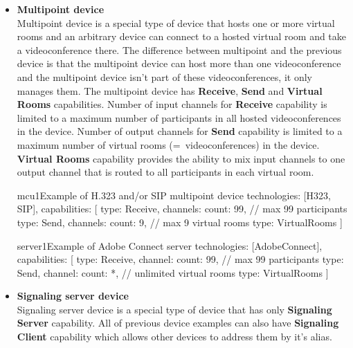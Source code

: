 \begin{itemize}
\begin{ResourceExample}{}{terminal4}%
      {Example of terminal with one virtual room for H.323 and/or SIP}
technologies: [H323, SIP],
capabilities: [
  {type: Receive, channels: {count: 9}}, // max 9 other participants
  {type: Send, channels: {count: 1}},
  {type: Mix}
]
\end{ResourceExample}

\item \textbf{Multipoint device} \\
  Multipoint device is a special type of device that hosts one or more virtual 
  rooms and an arbitrary device can connect to a hosted virtual room and take 
  a videoconference there. The difference between multipoint and the previous 
  device is that the multipoint device can host more than one videoconference 
  and the multipoint device isn't part of these videoconferences, it only 
  manages them. The multipoint device has \textbf{Receive}, \textbf{Send}
  and \textbf{Virtual Rooms} capabilities. Number of input 
  channels for \textbf{Receive} capability is limited to a maximum number of 
  participants in all hosted videoconferences in the device. Number of output 
  channels for \textbf{Send} capability is limited to a maximum number of 
  virtual rooms (=~videoconferences) in the device. \textbf{Virtual Rooms} 
  capability provides the ability to mix input channels to one output channel 
  that is routed to all participants in each virtual room.

\begin{ResourceExample}{}{mcu1}{Example of H.323 and/or SIP multipoint device}
technologies: [H323, SIP],
capabilities: [
  {type: Receive, channels: {count: 99}}, // max 99 participants
  {type: Send, channels: {count: 9}},     // max 9 virtual rooms
  {type: VirtualRooms}
]
\end{ResourceExample}

\begin{ResourceExample}{}{server1}{Example of Adobe Connect server}
technologies: [AdobeConnect],
capabilities: [
  {type: Receive, channel: {count: 99}}, // max 99 participants
  {type: Send, channel: {count: *}},     // unlimited virtual rooms
  {type: VirtualRooms}
]
\end{ResourceExample}

\item \textbf{Signaling server device} \\
  Signaling server device is a special type of device that has only 
  \textbf{Signaling Server} capability. All of previous device examples can 
  also have \textbf{Signaling Client} capability which allows other devices
  to address them by it's alias.
    

\end{itemize}
